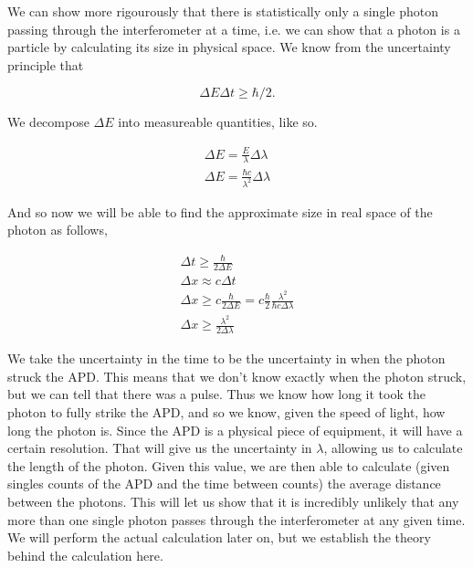 \documentclass{article}
\begin{document}
	\hspace{.25cm}

	We can show more rigourously that there is statistically only a single photon passing through the interferometer at a time, i.e. we can show that a photon is a particle by calculating its size in physical space.  We know from the uncertainty principle that

	\begin{equation*}
		\Delta E \Delta t \geq \hbar/2.
	\end{equation*}

	We decompose $\Delta E$ into measureable quantities, like so.

	\begin{gather*}
		\Delta E = \frac{E}{\lambda} \Delta \lambda \\
		\Delta E = \frac{\hbar c}{\lambda^2}\Delta \lambda
	\end{gather*}

	And so now we will be able to find the approximate size in real space of the photon as follows,

	\begin{gather*}
		\Delta t \geq \frac{\hbar}{2\Delta E} \\
		\Delta x \approx c\Delta t \\
		\Delta x \geq c\frac{\hbar}{2\Delta E} = c\frac{\hbar}{2}\frac{\lambda^2}{\hbar c \Delta \lambda} \\
		\Delta x \geq \frac{\lambda^2}{2\Delta \lambda}
	\end{gather*}

	We take the uncertainty in the time to be the uncertainty in when the photon struck the APD.  This means that we don't know exactly when the photon struck, but we can tell that there was a pulse.  Thus we know how long it took the photon to fully strike the APD, and so we know, given the speed of light, how long the photon is.  Since the APD is a physical piece of equipment, it will have a certain resolution.  That will give us the uncertainty in $\lambda$, allowing us to calculate the length of the photon.  Given this value, we are then able to calculate (given singles counts of the APD and the time between counts) the average distance between the photons.  This will let us show that it is incredibly unlikely that any more than one single photon passes through the interferometer at any given time.  We will perform the actual calculation later on, but we establish the theory behind the calculation here.

	\hspace{.25cm}
\end{document}
